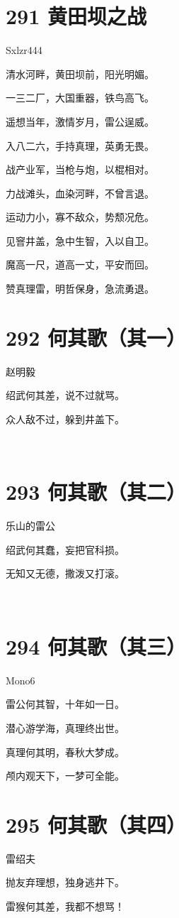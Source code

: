 \documentclass[UTF8,12pt,oneside]{ctexbook}
\def\pau#1{\begin{center} {#1} \end{center}} %
\def\poem#1#2{\section{#1}\pau{#2}} %
\begin{document}
        \poem{291 黄田坝之战}{Sxlzr444}
        \begin{center}
        清水河畔，黄田坝前，阳光明媚。
        
        一三二厂，大国重器，铁鸟高飞。
        
        遥想当年，激情岁月，雷公逞威。
        
        入八二六，手持真理，英勇无畏。
        
        战产业军，当枪与炮，以棍相对。
        
        力战滩头，血染河畔，不曾言退。
        
        运动力小，寡不敌众，势颓况危。
        
        见窨井盖，急中生智，入以自卫。
        
        魔高一尺，道高一丈，平安而回。
        
        赞真理雷，明哲保身，急流勇退。
        \end{center}

        \poem{292 何其歌（其一）}{赵明毅}
        \begin{center}
            绍武何其差，说不过就骂。
            
            众人敌不过，躲到井盖下。

            ~\\
        \end{center}

        \poem{293 何其歌（其二）}{乐山的雷公}
        \begin{center}
            绍武何其蠢，妄把官科损。
            
            无知又无德，撒泼又打滚。

            ~\\
        \end{center}

        \poem{294 何其歌（其三）}{Mono6}
        \begin{center}
            雷公何其智，十年如一日。
            
            潜心游学海，真理终出世。
            
            真理何其明，春秋大梦成。
            
            颅内观天下，一梦可全能。
        \end{center}

        \newpage

        \poem{295 何其歌（其四）}{雷绍夫}
        \begin{center}
            抛友弃理想，独身逃井下。
            
            雷猴何其差，我都不想骂！

        \end{center}
\end{document}
